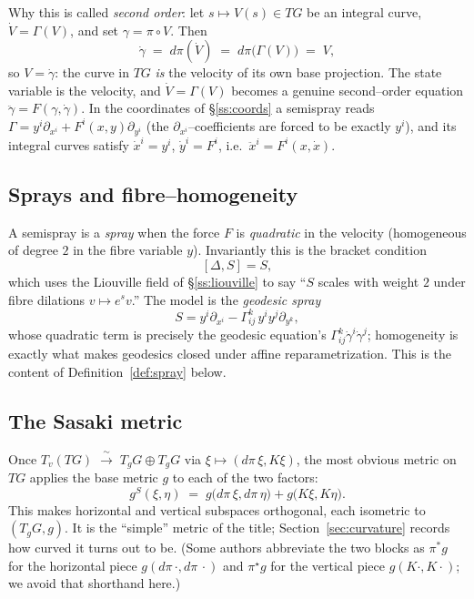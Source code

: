 \documentclass[11pt]{article}
\theoremstyle{definition}
\theoremstyle{plain}
\newcommand{\dpi}{d\pi}
\newcommand{\TG}{TG}
\newcommand{\Liou}{\Delta}
\newcommand{\gS}{g^{S}}
\newcommand{\dd}[1]{\partial_{#1}}
\newcommand{\iso}{\;\xrightarrow{\;\sim\;}\;}
\begin{document}
Why this is called \emph{second order}: let $s\mapsto V(s)\in\TG$ be an integral curve,
$\dot V=\Gamma(V)$, and set $\gamma=\pi\circ V$. Then
\[
  \dot\gamma \;=\; \dpi(\dot V)\;=\;\dpi\bigl(\Gamma(V)\bigr)\;=\;V ,
\]
so $V=\dot\gamma$: the curve in $\TG$ \emph{is} the velocity of its own base projection.
The state variable is the velocity, and $\dot V=\Gamma(V)$ becomes a genuine second--order
equation $\ddot\gamma=F(\gamma,\dot\gamma)$. In the coordinates of \S\ref{ss:coords} a
semispray reads $\Gamma=y^{i}\dd{x^{i}}+F^{i}(x,y)\dd{y^{i}}$ (the $\dd{x^{i}}$--coefficients
are forced to be exactly $y^{i}$), and its integral curves satisfy $\dot x^{i}=y^{i}$,
$\dot y^{i}=F^{i}$, i.e.\ $\ddot x^{i}=F^{i}(x,\dot x)$.

\subsection{Sprays and fibre--homogeneity}\label{ss:sprays}

A semispray is a \emph{spray} when the force $F$ is \emph{quadratic} in the velocity
(homogeneous of degree $2$ in the fibre variable $y$). Invariantly this is the bracket
condition
\[
  [\Liou,S]=S ,
\]
which uses the Liouville field of \S\ref{ss:liouville} to say ``$S$ scales with weight $2$
under fibre dilations $v\mapsto e^{s}v$.'' The model is the \emph{geodesic spray}
\[
  S=y^{i}\dd{x^{i}}-\Gamma^{k}_{ij}\,y^{i}y^{j}\dd{y^{k}},
\]
whose quadratic term is precisely the geodesic equation's
$\Gamma^{k}_{ij}\dot\gamma^{i}\dot\gamma^{j}$; homogeneity is exactly what makes geodesics
closed under affine reparametrization. This is the content of
Definition~\ref{def:spray} below.

\subsection{The Sasaki metric}\label{ss:sasaki-intro}

Once $T_{v}(\TG)\iso T_{g}G\oplus T_{g}G$ via $\xi\mapsto(\dpi\,\xi,K\xi)$, the most
obvious metric on $\TG$ applies the base metric $g$ to each of the two factors:
\[
  \gS(\xi,\eta)\;=\;g\bigl(\dpi\,\xi,\dpi\,\eta\bigr)+g\bigl(K\xi,K\eta\bigr).
\]
This makes horizontal and vertical subspaces orthogonal, each isometric to $(T_{g}G,g)$.
It is the ``simple'' metric of the title; Section~\ref{sec:curvature} records how curved it
turns out to be. (Some authors abbreviate the two blocks as $\pi^{*}g$ for the horizontal
piece $g(\dpi\,\cdot,\dpi\,\cdot)$ and $\pi^{\star}g$ for the vertical piece
$g(K\cdot,K\cdot)$; we avoid that shorthand here.)
\end{document}
